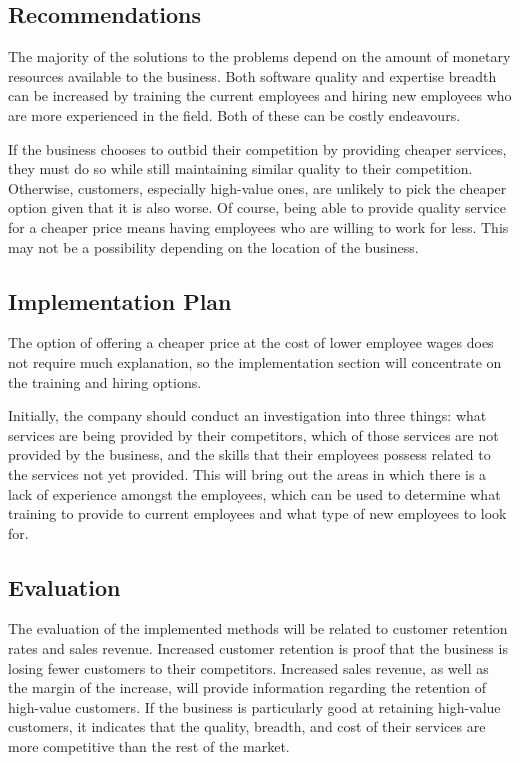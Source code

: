\documentclass{article}
\begin{document}
\subsection{Recommendations}
The majority of the solutions to the problems depend on the amount of monetary resources available to the business. Both software quality and expertise breadth can be increased by training the current employees and hiring new employees who are more experienced in the field. Both of these can be costly endeavours.

If the business chooses to outbid their competition by providing cheaper services, they must do so while still maintaining similar quality to their competition. Otherwise, customers, especially high-value ones, are unlikely to pick the cheaper option given that it is also worse. Of course, being able to provide quality service for a cheaper price means having employees who are willing to work for less. This may not be a possibility depending on the location of the business.

\subsection{Implementation Plan}
The option of offering a cheaper price at the cost of lower employee wages does not require much explanation, so the implementation section will concentrate on the training and hiring options.

Initially, the company should conduct an investigation into three things: what services are being provided by their competitors, which of those services are not provided by the business, and the skills that their employees possess related to the services not yet provided. This will bring out the areas in which there is a lack of experience amongst the employees, which can be used to determine what training to provide to current employees and what type of new employees to look for.

\subsection{Evaluation}
The evaluation of the implemented methods will be related to customer retention rates and sales revenue. Increased customer retention is proof that the business is losing fewer customers to their competitors. Increased sales revenue, as well as the margin of the increase, will provide information regarding the retention of high-value customers. If the business is particularly good at retaining high-value customers, it indicates that the quality, breadth, and cost of their services are more competitive than the rest of the market.
\end{document}
